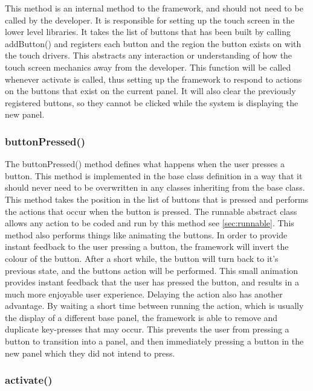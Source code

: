 This method is an internal method to the framework, and should not need to be called by the developer. It is responsible for setting up the touch screen in the lower level libraries. It takes the list of buttons that has been built by calling addButton() and registers each button and the region the button exists on with the touch drivers. This abstracts any interaction or understanding of how the touch screen mechanics away from the developer. This function will be called whenever activate is called, thus setting up the framework to respond to actions on the buttons that exist on the current panel. It will also clear the previously registered buttons, so they cannot be clicked while the system is displaying the new panel.

\subsubsection{buttonPressed()}
\label{sec:base:butpress}
The buttonPressed() method defines what happens when the user presses a button. This method is implemented in the base class definition in a way that it should never need to be overwritten in any classes inheriting from the base class. This method takes the position in the list of buttons that is pressed and performs the actions that occur when the button is pressed. The runnable abstract class allows any action to be coded and run by this method see \ref{sec:runnable}. This method also performs things like animating the buttons. In order to provide instant feedback to the user pressing a button, the framework will invert the colour of the button. After a short while, the button will turn back to it's previous state, and the buttons action will be performed. This small animation provides instant feedback that the user has pressed the button, and results in a much more enjoyable user experience. Delaying the action also has another advantage. By waiting a short time between running the action, which is usually the display of a different base panel, the framework is able to remove and duplicate key-presses that may occur. This prevents the user from pressing a button to transition into a panel, and then immediately pressing a button in the new panel which they did not intend to press.

\subsubsection{activate()}
\label{sec:activate}

